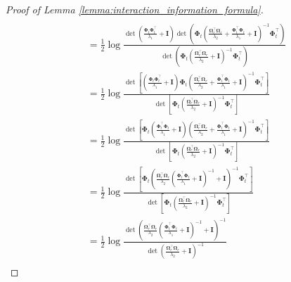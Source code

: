 \begin{proof}[Proof of Lemma \ref{lemma:interaction_information_formula}]
\begin{align}
        \\
        & = \frac{1}{2}\log \frac{ \det (\frac{\boldsymbol{\Phi}_t\boldsymbol{\Phi}_t^\top}{\lambda_1} +\mathbf{I})
        \det(\boldsymbol{\Phi}_t \left(\frac{\boldsymbol{\Omega}_r^\top\boldsymbol{\Omega}_r}{\lambda_2}+\frac{\boldsymbol{\Phi}_t^\top \boldsymbol{\Phi}_t} {\lambda_1} + \mathbf{I}\right)^{-1} \boldsymbol{\Phi}_t^\top)
        }{\det(\boldsymbol{\Phi}_t \left(\frac{\boldsymbol{\Omega}_r^\top \boldsymbol{\Omega}_r}{\lambda_2} + \mathbf{I}\right)^{-1} \boldsymbol{\Phi}_t^\top)} 
        \\ 
        & = \frac{1}{2}\log \frac{\det[\left(\frac{\boldsymbol{\Phi}_t\boldsymbol{\Phi}_t^\top}{\lambda_1} +\mathbf{I}\right) \boldsymbol{\Phi}_t \left(\frac{\boldsymbol{\Omega}_r^\top\boldsymbol{\Omega}_r}{\lambda_2}+\frac{\boldsymbol{\Phi}_t^\top \boldsymbol{\Phi}_t} {\lambda_1} + \mathbf{I}\right)^{-1}\boldsymbol{\Phi}_t^\top]}
        {\det[ \boldsymbol{\Phi}_t \left(\frac{\boldsymbol{\Omega}_r^\top \boldsymbol{\Omega}_r}{\lambda_2} + \mathbf{I}\right)^{-1} \boldsymbol{\Phi}_t^\top]} 
        \\ 
        & = \frac{1}{2}\log \frac{
        \det[\boldsymbol{\Phi}_t \left(\frac{\boldsymbol{\Phi}_t^\top\boldsymbol{\Phi}_t}{\lambda_1} +\mathbf{I}\right)  \left(\frac{\boldsymbol{\Omega}_r^\top\boldsymbol{\Omega}_r}{\lambda_2}+\frac{\boldsymbol{\Phi}_t^\top \boldsymbol{\Phi}_t} {\lambda_1} + \mathbf{I}\right)^{-1}\boldsymbol{\Phi}_t^\top]}
        {\det[ \boldsymbol{\Phi}_t \left(\frac{\boldsymbol{\Omega}_r^\top \boldsymbol{\Omega}_r}{\lambda_2} + \mathbf{I}\right)^{-1} \boldsymbol{\Phi}_t^\top]} 
        \\
        & = \frac{1}{2}\log \frac{
        \det[\boldsymbol{\Phi}_t  \left(\frac{\boldsymbol{\Omega}_r^\top \boldsymbol{\Omega}_r}{\lambda_2} \left(\frac{\boldsymbol{\Phi}_t^\top\boldsymbol{\Phi}_t}{\lambda_1} +\mathbf{I}\right)^{-1} + \mathbf{I}\right)^{-1}\boldsymbol{\Phi}_t^\top]}
        {\det[ \boldsymbol{\Phi}_t \left(\frac{\boldsymbol{\Omega}_r^\top \boldsymbol{\Omega}_r}{\lambda_2} + \mathbf{I}\right)^{-1} \boldsymbol{\Phi}_t^\top]}
        \\
        \label{Eqn:det_division}
        &= \frac{1}{2}\log \frac{\det\left(\frac{\boldsymbol{\Omega}_r^\top \boldsymbol{\Omega}_r}{\lambda_2} \left(\frac{\boldsymbol{\Phi}_t^\top\boldsymbol{\Phi}_t}{\lambda_1} +\mathbf{I}\right)^{-1} + \mathbf{I}\right)^{-1}}{\det (\frac{\boldsymbol{\Omega}_r^\top\boldsymbol{\Omega}_r}{\lambda_2} + \mathbf{I})^{-1}}
        \\

\end{align}
\end{proof}
